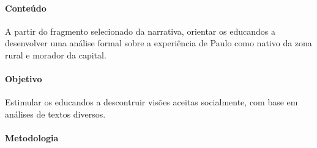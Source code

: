\documentclass{extrarticle}
\begin{document}
\paragraph{Conteúdo}
A partir do fragmento selecionado da narrativa, orientar os educandos
a desenvolver uma análise formal sobre a experiência de Paulo como
nativo da zona rural e morador da capital.

\paragraph{Objetivo}
Estimular os educandos a descontruir visões aceitas socialmente, com
base em análises de textos diversos.

\paragraph{Metodologia}
\end{document}
